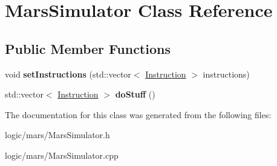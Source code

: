 \hypertarget{classMarsSimulator}{}\section{Mars\+Simulator Class Reference}
\label{classMarsSimulator}
\subsection*{Public Member Functions}
\begin{DoxyCompactItemize}
\item 
\mbox{\label{classMarsSimulator_a0d98b56cf57951938dfa4717740a0f46}} 
void {\bfseries set\+Instructions} (std\+::vector$<$ \hyperlink{classInstruction}{Instruction} $>$ instructions)
\item 
\mbox{\label{classMarsSimulator_ac6cb4d312eb69f228de36e72d8482232}} 
std\+::vector$<$ \hyperlink{classInstruction}{Instruction} $>$ {\bfseries do\+Stuff} ()
\end{DoxyCompactItemize}


The documentation for this class was generated from the following files\+:\begin{DoxyCompactItemize}
\item 
logic/mars/Mars\+Simulator.\+h\item 
logic/mars/Mars\+Simulator.\+cpp\end{DoxyCompactItemize}
